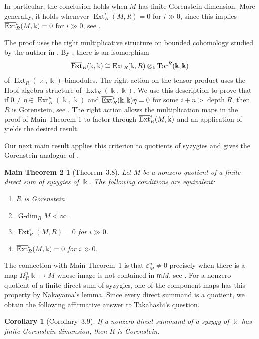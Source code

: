 \documentclass{amsart}
\newtheorem*{maintheorem2}{Main Theorem 2}
\newtheorem*{corollary2}{Corollary}
\theoremstyle{definition}
\theoremstyle{definition}
\theoremstyle{remark}
\numberwithin{equation}{section}
\newcommand{\kk}{\Bbbk}
\newcommand{\Ext}{\operatorname{Ext}}
\newcommand{\bExt}{\overline{\operatorname{Ext}}{\vphantom E}}
\newcommand{\gdim}{\operatorname{G-dim}}
\newcommand{\Tor}{\operatorname{Tor}}
\newcommand{\m}{\mathfrak{m}}
\newcommand{\depth}{\operatorname{depth}}
\begin{document}
In particular, the conclusion holds when $M$ has finite
Gorenstein dimension. More generally, it holds whenever
$\Ext_R^i(M,R)=0$ for $i\gg0$, since this implies
$\bExt_R^i(M,\kk)=0$ for $i\gg0$, see
.

The proof uses the right multiplicative structure on bounded
cohomology studied by the author in \cite{bimodule}. By
\cite[Corollary 3.5]{bimodule}, there is an isomorphism
\[
\bExt_R(\kk,\kk)
\cong
\Ext_R(\kk,R)\otimes_\kk\Tor^R(\kk,\kk)
\]
of $\Ext_R(\kk,\kk)$-bimodules. The right action on the tensor
product uses the Hopf algebra structure of $\Ext_R(\kk,\kk)$.
We use this description to prove that if
$0\neq\eta\in\Ext_R^n(\kk,\kk)$ and
$\bExt_R^i(\kk,\kk)\eta=0$ for some $i+n>\depth R$, then $R$
is Gorenstein, see . The right action allows the multiplication maps
in the proof of Main Theorem 1 to factor through $\bExt_R^i(M,\kk)$ and an application of  yields the desired result.

Our next main result applies this criterion to quotients of
syzygies and gives the Gorenstein analogue of
\cite[Corollary 9]{extremal}.

\begin{maintheorem2}[Theorem~3.8]
Let $M$ be a nonzero quotient of a finite direct sum of syzygies
of $\kk$. The following conditions are equivalent:
\begin{enumerate}
\item $R$ is Gorenstein.
\item $\gdim_R M<\infty$.
\item $\Ext_R^i(M,R)=0$ for $i\gg0$.
\item $\bExt_R^i(M,\kk)=0$ for $i\gg0$.
\end{enumerate}
\end{maintheorem2}

The connection with Main Theorem~1 is that
$\varepsilon_M^n\neq0$ precisely when there is a map
$\Omega_R^n\kk\to M$ whose image is not contained in $\m M$, see .
For a nonzero quotient of a finite direct sum of syzygies, one
of the component maps has this property by Nakayama's lemma.
Since every direct summand is a quotient, we obtain the
following affirmative answer to Takahashi's question.

\begin{corollary2}[Corollary~3.9]
If a nonzero direct summand of a syzygy of $\kk$ has finite
Gorenstein dimension, then $R$ is Gorenstein.
\end{corollary2}
\end{document}
